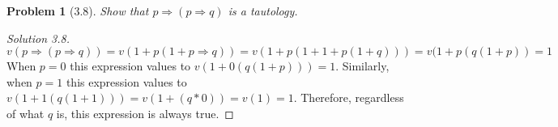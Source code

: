 \documentclass{article}
\theoremstyle{problemstyle}
\newtheorem{problem}{Problem}
\begin{document}
\begin{problem}[3.8]
Show that $p \Rightarrow (p \Rightarrow q)$ is a tautology. 
\end{problem}
\begin{proof}[Solution 3.8]
$v(p \Rightarrow (p \Rightarrow q)) = v(1+ p(1+ p \Rightarrow q)) = v(1+ p(1+1+p(1+q))) = v(1+p(q(1+p)) = 1$ When $p = 0$ this expression values to $v(1+0(q(1+p))) = 1$. Similarly, when $p = 1$ this expression values to $v(1+1(q(1+1))) = v(1+(q*0)) = v(1) = 1$. Therefore, regardless of what $q$ is, this expression is always true. 
\end{proof}
\end{document}
